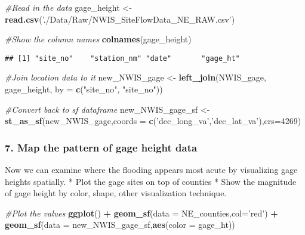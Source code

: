 \documentclass[]{article}
\newenvironment{Shaded}{\begin{snugshade}}{\end{snugshade}}
\newcommand{\KeywordTok}[1]{\textcolor[rgb]{0.13,0.29,0.53}{\textbf{#1}}}
\newcommand{\DataTypeTok}[1]{\textcolor[rgb]{0.13,0.29,0.53}{#1}}
\newcommand{\DecValTok}[1]{\textcolor[rgb]{0.00,0.00,0.81}{#1}}
\newcommand{\StringTok}[1]{\textcolor[rgb]{0.31,0.60,0.02}{#1}}
\newcommand{\CommentTok}[1]{\textcolor[rgb]{0.56,0.35,0.01}{\textit{#1}}}
\newcommand{\OperatorTok}[1]{\textcolor[rgb]{0.81,0.36,0.00}{\textbf{#1}}}
\newcommand{\NormalTok}[1]{#1}
\begin{document}
\begin{Shaded}
\begin{Highlighting}[]
\CommentTok{#Read in the data}
\NormalTok{gage_height <-}\StringTok{ }\KeywordTok{read.csv}\NormalTok{(}\StringTok{'./Data/Raw/NWIS_SiteFlowData_NE_RAW.csv'}\NormalTok{)}

\CommentTok{#Show the column names}
\KeywordTok{colnames}\NormalTok{(gage_height)}
\end{Highlighting}
\end{Shaded}

\begin{verbatim}
## [1] "site_no"    "station_nm" "date"       "gage_ht"
\end{verbatim}

\begin{Shaded}
\begin{Highlighting}[]
\CommentTok{#Join location data to it}
\NormalTok{new_NWIS_gage <-}\StringTok{ }\KeywordTok{left_join}\NormalTok{(NWIS_gage, gage_height, }\DataTypeTok{by =} \KeywordTok{c}\NormalTok{(}\StringTok{"site_no"}\NormalTok{, }\StringTok{"site_no"}\NormalTok{))}

\CommentTok{#Convert back to sf dataframe}
\NormalTok{new_NWIS_gage_sf <-}\StringTok{ }\KeywordTok{st_as_sf}\NormalTok{(new_NWIS_gage,}\DataTypeTok{coords =} \KeywordTok{c}\NormalTok{(}\StringTok{'dec_long_va'}\NormalTok{,}\StringTok{'dec_lat_va'}\NormalTok{),}\DataTypeTok{crs=}\DecValTok{4269}\NormalTok{)}
\end{Highlighting}
\end{Shaded}

\subsubsection{7. Map the pattern of gage height
data}\label{map-the-pattern-of-gage-height-data}

Now we can examine where the flooding appears most acute by visualizing
gage heights spatially. * Plot the gage sites on top of counties * Show
the magnitude of gage height by color, shape, other visualization
technique.

\begin{Shaded}
\begin{Highlighting}[]
\CommentTok{#Plot the values}
\KeywordTok{ggplot}\NormalTok{() }\OperatorTok{+}
\StringTok{  }\KeywordTok{geom_sf}\NormalTok{(}\DataTypeTok{data =}\NormalTok{ NE_counties,}\DataTypeTok{col=}\StringTok{'red'}\NormalTok{) }\OperatorTok{+}
\StringTok{  }\KeywordTok{geom_sf}\NormalTok{(}\DataTypeTok{data =}\NormalTok{ new_NWIS_gage_sf,}\KeywordTok{aes}\NormalTok{(}\DataTypeTok{color =}\NormalTok{ gage_ht))}
\end{Highlighting}
\end{Shaded}
\end{document}
